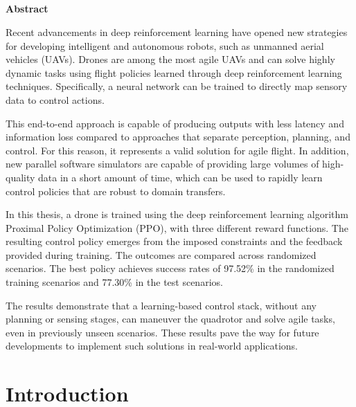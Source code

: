 \documentclass[a4paper,oneside]{book}
\theoremstyle{definition}
\begin{document}

\begin{center}
	\chapter*{}
	\thispagestyle{empty}
	{\Huge\textbf{Abstract}}\\
	\vspace{15mm}
\end{center}

Recent advancements in deep reinforcement learning have opened new strategies for developing intelligent and autonomous robots, such as unmanned aerial vehicles (UAVs). Drones are among the most agile UAVs and can solve highly dynamic tasks using flight policies learned through deep reinforcement learning techniques. Specifically, a neural network can be trained to directly map sensory data to control actions. 

This end-to-end approach is capable of producing outputs with less latency and information loss compared to approaches that separate perception, planning, and control. For this reason, it represents a valid solution for agile flight. In addition, new parallel software simulators are capable of providing large volumes of high-quality data in a short amount of time, which can be used to rapidly learn control policies that are robust to domain transfers.

In this thesis, a drone is trained using the deep reinforcement learning algorithm Proximal Policy Optimization (PPO), with three different reward functions. The resulting control policy emerges from the imposed constraints and the feedback provided during training. The outcomes are compared across randomized scenarios. The best policy achieves success rates of 97.52\% in the randomized training scenarios and 77.30\% in the test scenarios.

The results demonstrate that a learning-based control stack, without any planning or sensing stages, can maneuver the quadrotor and solve agile tasks, even in previously unseen scenarios. These results pave the way for future developments to implement such solutions in real-world applications.


\tableofcontents\thispagestyle{empty}
\listoffigures\thispagestyle{empty}


\chapter*{Introduction}
\end{document}
